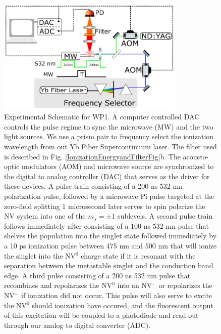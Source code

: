 \begin{figure}
\centering
\includegraphics[width=0.8\textwidth]{Figures/WP1Schematic.png}
\caption{Experimental Schematic for WP1. A computer controlled DAC controls the pulse regime to sync the microwave (MW) and the two light sources. We use a prism pair to frequency select the ionization wavelength from out Yb Fiber Supercontinuum laser. The filter used is described in Fig. \ref{IonizationEnergyandFilterFig}b.  The acousto-optic modulators (AOM) and microwave source are synchronized to the digital to analog controller (DAC) that serves as the driver for these devices.  A pulse train consisting of a 200 ns 532 nm polarization pulse, followed by a microwave Pi pulse targeted at the zero-field splitting 1 microsecond later serves to spin polarize the NV system into one of the $m_s=\pm1$ sublevels.  A second pulse train follows immediately after consisting of a 100 ns 532 nm pulse that shelves the population into the singlet state followed immediately by a 10 ps ionization pulse between 475 nm and 500 nm that will ionize the singlet into the NV$^0$ charge state if it is resonant with the separation between the metastable singlet and the conduction band edge.  A third pulse consisting of a 200 ns 532 nm pulse that recombines and repolarizes the NV$^0$ into an NV$^-$ or repolarizes the NV$^-$ if ionization did not occur.  This pulse will also serve to excite the NV$^0$ should ionization have occured, and the fluorescent output of this excitation will be coupled to a photodiode and read out through our analog to digital converter (ADC).}
\label{WP1Schematic}
\end{figure}


